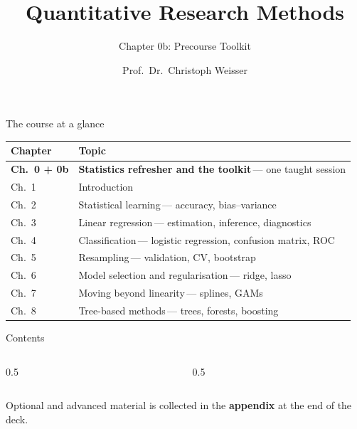 \documentclass[aspectratio=169,11pt]{beamer}
\title{Quantitative Research Methods}
\subtitle{Chapter 0b: Precourse Toolkit}
\author{Prof.\ Dr.\ Christoph Weisser}
\date{}\graphicspath{{images/}}
\begin{document}
\begin{frame}[plain]\titlepage\end{frame}

\begin{frame}{The course at a glance}
  \vspace{-1.5mm}
  \begin{center}
  \scriptsize
  \setlength{\tabcolsep}{5pt}
  \renewcommand{\arraystretch}{1.30}
  \begin{tabular}{@{\hspace{2pt}}l >{\raggedright\arraybackslash}p{}@{\hspace{2pt}}}
    \toprule
    \textbf{Chapter} & \textbf{Topic} \\
    \midrule
    \rowcolor{accent!18} \textbf{Ch.\ 0 + 0b} & \textbf{Statistics refresher and the toolkit}\,{\color{accent!75!black}--- one taught session} \\
    \rowcolor{black!3} {\color{accent}Ch.\ 1} & Introduction \\
     {\color{accent}Ch.\ 2} & Statistical learning\,{\color{black!45}--- accuracy, bias--variance} \\
    \rowcolor{black!3} {\color{accent}Ch.\ 3} & Linear regression\,{\color{black!45}--- estimation, inference, diagnostics} \\
     {\color{accent}Ch.\ 4} & Classification\,{\color{black!45}--- logistic regression, confusion matrix, ROC} \\
    \rowcolor{black!3} {\color{accent}Ch.\ 5} & Resampling\,{\color{black!45}--- validation, CV, bootstrap} \\
     {\color{accent}Ch.\ 6} & Model selection and regularisation\,{\color{black!45}--- ridge, lasso} \\
    \rowcolor{black!3} {\color{accent}Ch.\ 7} & Moving beyond linearity\,{\color{black!45}--- splines, GAMs} \\
     {\color{accent}Ch.\ 8} & Tree-based methods\,{\color{black!45}--- trees, forests, boosting} \\
    \bottomrule
  \end{tabular}
  \end{center}
\end{frame}

\begin{frame}{Contents}
  \begin{columns}[t]
    \begin{column}{0.5\textwidth}
      \tableofcontents[hideallsubsections,sections={1-4}]
    \end{column}
    \begin{column}{0.5\textwidth}
      \tableofcontents[hideallsubsections,sections={5-7}]
    \end{column}
  \end{columns}
  \vfill
  {\tiny Optional and advanced material is collected in the \textbf{appendix} at the end of the deck.}
\end{frame}
\end{document}
